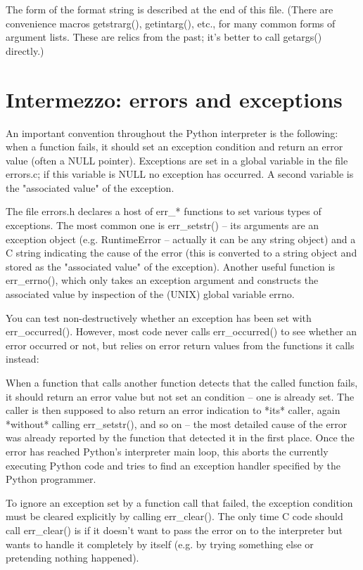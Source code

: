 The form of the format string is described at the end of this file.
(There are convenience macros getstrarg(), getintarg(), etc., for many
common forms of argument lists.  These are relics from the past; it's
better to call getargs() directly.)


\section{Intermezzo: errors and exceptions}

An important convention throughout the Python interpreter is the
following: when a function fails, it should set an exception condition
and return an error value (often a NULL pointer).  Exceptions are set
in a global variable in the file errors.c; if this variable is NULL no
exception has occurred.  A second variable is the "associated value"
of the exception.

The file errors.h declares a host of err_* functions to set various
types of exceptions.  The most common one is err_setstr() -- its
arguments are an exception object (e.g. RuntimeError -- actually it
can be any string object) and a C string indicating the cause of the
error (this is converted to a string object and stored as the
"associated value" of the exception).  Another useful function is
err_errno(), which only takes an exception argument and constructs the
associated value by inspection of the (UNIX) global variable errno.

You can test non-destructively whether an exception has been set with
err_occurred().  However, most code never calls err_occurred() to see
whether an error occurred or not, but relies on error return values
from the functions it calls instead:

When a function that calls another function detects that the called
function fails, it should return an error value but not set an
condition -- one is already set.  The caller is then supposed to also
return an error indication to *its* caller, again *without* calling
err_setstr(), and so on -- the most detailed cause of the error was
already reported by the function that detected it in the first place.
Once the error has reached Python's interpreter main loop, this aborts
the currently executing Python code and tries to find an exception
handler specified by the Python programmer.

To ignore an exception set by a function call that failed, the
exception condition must be cleared explicitly by calling err_clear().
The only time C code should call err_clear() is if it doesn't want to
pass the error on to the interpreter but wants to handle it completely
by itself (e.g. by trying something else or pretending nothing
happened).

